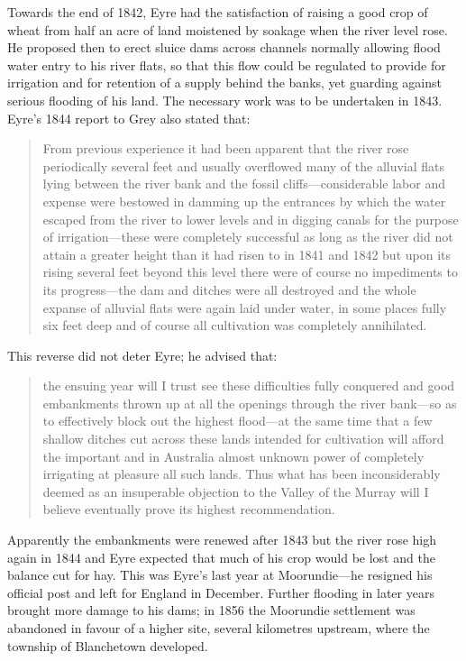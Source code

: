 Towards the end of 1842, Eyre had the satisfaction of raising a good
crop of wheat from half an acre of land moistened by soakage when the
river level rose.  He proposed then to erect sluice dams across
channels normally allowing flood water entry to his river flats, so
that this flow could be regulated to provide for irrigation and for
retention of a supply behind the banks, yet guarding against serious
flooding of his land.  The
necessary work was to be undertaken in 1843.  Eyre's 1844 report to
Grey also stated that:
\begin{quote}
	From previous experience it had been apparent that the river
	rose periodically several feet and usually overflowed many of
	the alluvial flats lying between the river bank and the fossil
	cliffs---considerable labor and expense were bestowed in
	damming up the entrances by which the water escaped from the
	river to lower levels and in digging canals for the purpose of
	irrigation---these were completely successful as long as the
	river did not attain a greater height than it had risen to in
	1841 and 1842 but upon its rising several feet beyond this
	level there were of course no impediments to its
	progress---the dam and ditches were all destroyed and the
	whole expanse of alluvial flats were again laid under water,
	in some places fully six feet deep and of course all
	cultivation was completely annihilated.
\end{quote}

This reverse did not deter Eyre; he advised that:
\begin{quote}
	the ensuing year will I trust see these difficulties fully
        conquered and good embankments thrown up at all the openings
        through the river bank---so as to effectively block out the
        highest flood---at the same time that a few shallow ditches
        cut across these lands intended for cultivation will afford
        the important and in Australia almost unknown power of
        completely irrigating at pleasure all such lands. Thus what
        has been inconsiderably deemed as an insuperable objection to
        the Valley of the Murray will I believe eventually prove its
        highest recommendation.
\end{quote}

Apparently the embankments were renewed after 1843 but the river rose
high again in 1844 and Eyre expected that much of his crop would be
lost and the balance cut for hay.  This was Eyre's last year at
Moorundie---he resigned his official post and left for England in
December.  Further flooding in later years brought more damage to his
dams; in 1856 the Moorundie settlement was abandoned in favour of a
higher site, several kilometres upstream, where the township of
Blanchetown developed.

